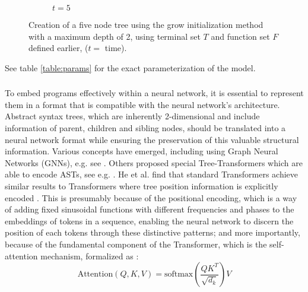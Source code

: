 \begin{figure}
    \begin{subfigure}[b]{0.2\textwidth}
        \centering
        \caption*{$t = 5$}
    \end{subfigure}
    
    \caption{Creation of a five node tree using the grow initialization method with a maximum depth of 2, using terminal set $T$ and function set $F$ defined earlier, ($t = $ time).}
    \label{fig:growth_trees}
    \end{figure}
    


See table \ref{table:params} for the exact parameterization of the model.


\subsubsection{}
To embed programs effectively within a neural network, it is essential to represent them in a format that is compatible with the neural network's architecture. Abstract syntax trees, which are inherently 2-dimensional and include information of parent, children and sibling nodes, should be translated into a neural network format while ensuring the preservation of this valuable structural information.
Various concepts have emerged, including using Graph Neural Networks (GNNs), e.g. see \cite{allamanis2017learning, velickovic_clrs_2022, Bieber_Sutton_Larochelle_Tarlow_2020, ibarz2022generalist}. Others proposed special Tree-Transformers which are able to encode ASTs, see e.g. \cite{peng_rethinking_2022, Wang_Lee_Chen_2019}.
He et al. find that standard Transformers achieve similar results to Transformers where tree position information is explicitly encoded \cite{he_trees_2021}. This is presumably because of the positional encoding, which is a way of adding fixed sinusoidal functions with different frequencies and phases to the embeddings of tokens in a sequence, enabling the neural network to discern the position of each tokens through these distinctive patterns; and more importantly, because of the fundamental component of the Transformer, which is the self-attention mechanism, formalized as \cite{Vaswani_Shazeer_Parmar_Uszkoreit_Jones_Gomez_Kaiser_Polosukhin_2017}:
\begin{equation}
    \text{Attention}(Q, K, V) = \text{softmax}(\frac{QK^T}{\sqrt{d_k}})V
\end{equation}

